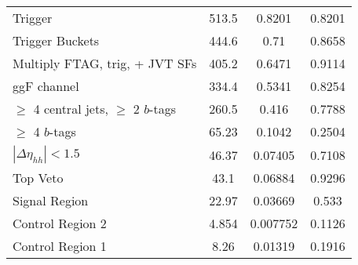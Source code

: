 \begin{table}
{\begin{tabular}{lccc}
Trigger                                &     513.5 &                 0.8201 &             0.8201 \\
Trigger Buckets                        &     444.6 &                   0.71 &             0.8658 \\
Multiply FTAG, trig, + JVT SFs         &     405.2 &                 0.6471 &             0.9114 \\
ggF channel                            &     334.4 &                 0.5341 &             0.8254 \\
$\ge$ 4 central jets, $\ge$ 2 $b$-tags &     260.5 &                  0.416 &             0.7788 \\
$\ge$ 4 $b$-tags                       &     65.23 &                 0.1042 &             0.2504 \\
$|\Delta\eta_{hh}| < 1.5$              &     46.37 &                0.07405 &             0.7108 \\
Top Veto                               &      43.1 &                0.06884 &             0.9296 \\
Signal Region                          &     22.97 &                0.03669 &              0.533 \\
Control Region 2                       &     4.854 &               0.007752 &             0.1126 \\
Control Region 1                       &      8.26 &                0.01319 &             0.1916 \\
\bottomrule
\end{tabular}
} \ 
\end{table}